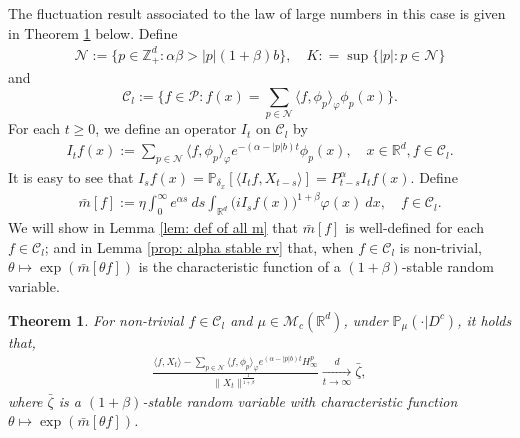 \documentclass[12pt,a4paper]{amsart}
\theoremstyle{plain}
\newtheorem{thm}{Theorem}[section]
\theoremstyle{definition}
\numberwithin{equation}{section}
\begin{document}
The fluctuation result associated to the law of large numbers in this case is given in Theorem \ref{thm: large clt} below.
Define
\begin{align}
  \label{eq: def of N}
  \mathcal{N}
  :=\{p\in \mathbb{Z}_+^d: \alpha\beta>|p|(1+\beta)b\},
  \quad K : = \sup\{|p|: p \in \mathcal N\}
\end{align}
and
\begin{equation}
  \label{eq: def of Cl}
  \mathcal{C}_l
  :=\Big\{f\in \mathcal P: f(x)=\sum_{p\in\mathcal{N}}\langle f, \phi_p\rangle_{\varphi}\phi_p(x)\Big\}.
\end{equation}
For each $t\ge 0$, we define an operator $I_t$ on $\mathcal{C}_l$ by
\begin{align}
  \label{definition of Itf}
  I_t f(x)
  := \sum_{p\in \mathcal{N}}\langle f, \phi_p\rangle_{\varphi} e^{-(\alpha-|p|b)t}\phi_p(x)
  , \quad x\in \mathbb{R}^d, f\in \mathcal C_l.
\end{align}
It is easy to see that $I_sf(x)=\mathbb{P}_{\delta_x}[\langle I_t f, X_{t-s}\rangle]=P_{t-s}^{\alpha}I_tf(x)$.
Define
\begin{align}
  \label{bar-m}
  \bar{m}[f]
  :=\eta \int_{0}^{\infty} e^{\alpha s}~ds \int_{\mathbb R^d} \big(iI_sf(x)\big)^{1+\beta}\varphi(x)~dx,
  \quad f\in \mathcal C_l.
\end{align}
We will show in Lemma \ref{lem: def of all m} that $\bar{m}[f]$ is well-defined for each $f\in \mathcal C_l$; 
and in Lemma \ref{prop: alpha stable rv} that, when $f\in \mathcal C_l$ is non-trivial, $\theta \mapsto \exp( \bar m[\theta f])$ is the characteristic function of a $(1+\beta)$-stable random variable.
\begin{thm}
  \label{thm: large clt}
  For non-trivial $f\in\mathcal{C}_l$ and $\mu\in \mathcal{M}_c(\mathbb{R}^d)$, under $\mathbb{P}_{\mu}(\cdot|D^c)$, it holds that,
  \begin{align}
    \label{thm: large rate}
    \frac{\langle f, X_t\rangle-\sum_{p\in\mathcal{N}}\langle f,\phi_p\rangle_\varphi e^{(\alpha-|p|b)t}H^p_{\infty}}{\|X_t\|^\frac{1}{1+\beta}}
    \xrightarrow[t\to \infty]{d}\bar{\zeta},
  \end{align}
  where $\bar{\zeta}$ is a $(1+\beta)$-stable random variable with characteristic function
  $\theta\mapsto \exp(\bar{m}[\theta f])$.
\end{thm}
\end{document}
